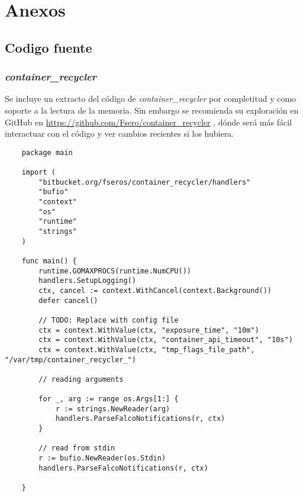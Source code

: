 \chapter{Anexos}

\section{Codigo fuente}

\subsection{\emph{container\_recycler}}
\label{subsec:containe-recycler-src-code}

Se incluye un extracto del código de \emph{container\_recycler} por completitud y como soporte a la lectura de la memoria. Sin
embargo se recomienda su exploración en GitHub en \href{https://github.com/Fsero/container\_recycler}{https://github.com/Fsero/container\_recycler} , dónde será más fácil interactuar con el código y ver cambios recientes si los 
hubiera.

\begin{verbatim}
    package main
    
    import (
        "bitbucket.org/fseros/container_recycler/handlers"
        "bufio"
        "context"
        "os"
        "runtime"
        "strings"
    )
    
    func main() {
        runtime.GOMAXPROCS(runtime.NumCPU())
        handlers.SetupLogging()
        ctx, cancel := context.WithCancel(context.Background())
        defer cancel()
    
        // TODO: Replace with config file
        ctx = context.WithValue(ctx, "exposure_time", "10m")
        ctx = context.WithValue(ctx, "container_api_timeout", "10s")
        ctx = context.WithValue(ctx, "tmp_flags_file_path", "/var/tmp/container_recycler_")
    
        // reading arguments
    
        for _, arg := range os.Args[1:] {
            r := strings.NewReader(arg)
            handlers.ParseFalcoNotifications(r, ctx)
        }
    
        // read from stdin
        r := bufio.NewReader(os.Stdin)
        handlers.ParseFalcoNotifications(r, ctx)
    
    }
    
\end{verbatim}

